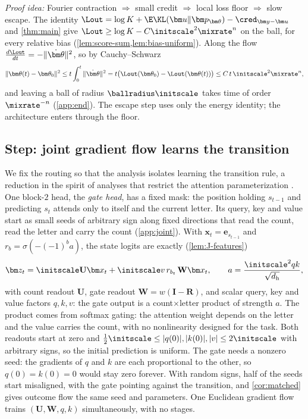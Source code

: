 \emph{Proof idea:} Fourier contraction $\Rightarrow$ small credit $\Rightarrow$ local loss floor $\Rightarrow$ slow escape. The identity
$\Lout=\log K+\E\KL(\bm u\|\bm p_{\bm\theta})-\cred_{\bm y-\bm u}$ and \cref{thm:main} give $\Lout\ge\log K-C\initscale^2\mixrate^n$ on the ball, for
every relative bias (\cref{lem:score-sum,lem:bias-uniform}). Along the flow $\frac{d\Lout}{dt}=-\|\dot{\bm\theta}\|^2$, so by Cauchy--Schwarz
\[
 \|\bm\theta(t)-\bm\theta_0\|^2\le t\int_0^t\|\dot{\bm\theta}\|^2=t\bigl(\Lout(\bm\theta_0)-\Lout(\bm\theta(t))\bigr)\le C\,t\,\initscale^2\mixrate^n,
\]
and leaving a ball of radius $\ballradius\initscale$ takes time of order $\mixrate^{-n}$ (\cref{app:end}). The escape step uses only the energy
identity; the architecture enters through the floor.

\subsection{Step: joint gradient flow learns the transition}
\label{sec:step}
We fix the routing so that the analysis isolates learning the transition rule, a reduction in the spirit of analyses that restrict the
attention parameterization \citep{kim2024parity}. One block-$2$ head, the \emph{gate head}, has a fixed mask: the position holding $s_{t-1}$ and
predicting $s_t$ attends only to itself and the current letter. Its query, key and value start as small seeds of arbitrary sign along fixed directions
that read the count, read the letter and carry the count (\cref{app:joint}). With $\bm x_t=\bm e_{s_{t-1}}$ and $r_b=\sigma(-(-1)^ba)$, the state logits are
exactly (\cref{lem:J-features})
\[
 \bm z_t=\initscale \mathbf U\bm x_t+\initscale v\,r_{b_t}\,\mathbf W\bm x_t,
 \qquad a=\frac{\initscale^2qk}{\sqrt{d_{\mathrm h}}},
\]
with count readout $\mathbf U$, gate readout $\mathbf W=w(\mathbf I-\mathbf R)$, and scalar query, key and value factors $q,k,v$: the gate output is
a count$\times$letter product of strength $a$. The product comes from softmax gating: the attention weight depends on the letter and the
value carries the count, with no nonlinearity designed for the task. Both readouts start at zero and $\frac12\initscale\le|q(0)|,|k(0)|,|v|\le2\initscale$ with arbitrary
signs, so the initial prediction is uniform. The gate needs a nonzero seed: the gradients of $q$ and $k$ are each proportional to the
other, so $q(0)=k(0)=0$ would stay zero forever. With random signs, half of the seeds start misaligned, with the gate pointing against
the transition, and \cref{cor:matched} gives outcome flow the same seed and parameters. One Euclidean gradient flow trains
$(\mathbf U,\mathbf W,q,k)$ simultaneously, with no stages.

